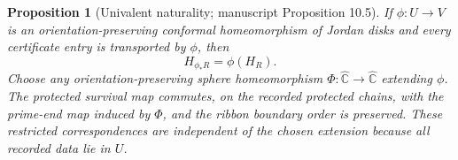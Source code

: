 \documentclass[11pt,reqno]{amsart}
\newtheorem{proposition}[theorem]{Proposition}
\theoremstyle{definition}
\theoremstyle{remark}
\newcommand{\Chat}{\widehat{\mathbb C}}
\begin{document}
\begin{proposition}[Univalent naturality; manuscript Proposition 10.5]
\label{prop:naturality}
If $\phi\colon U\to V$ is an orientation-preserving conformal
homeomorphism of Jordan disks and every certificate entry is transported
by $\phi$, then
\begin{equation}\label{eq:C-naturality}
H_{\phi_*R}=\phi(H_R).
\end{equation}
Choose any orientation-preserving sphere homeomorphism
$\Phi\colon\Chat\to\Chat$ extending $\phi$.  The protected survival map
commutes, on the recorded protected chains, with the prime-end map induced
by $\Phi$, and the ribbon boundary order is preserved.  These restricted
correspondences are independent of the chosen extension because all
recorded data lie in $U$.
\end{proposition}
\end{document}
